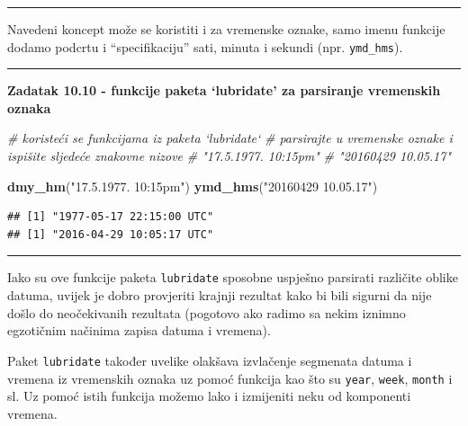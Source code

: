 \documentclass[]{book}
\newenvironment{Shaded}{\begin{snugshade}}{\end{snugshade}}
\newcommand{\KeywordTok}[1]{\textcolor[rgb]{0.13,0.29,0.53}{\textbf{#1}}}
\newcommand{\StringTok}[1]{\textcolor[rgb]{0.31,0.60,0.02}{#1}}
\newcommand{\CommentTok}[1]{\textcolor[rgb]{0.56,0.35,0.01}{\textit{#1}}}
\newcommand{\NormalTok}[1]{#1}
\theoremstyle{definition}
\theoremstyle{definition}
\theoremstyle{definition}
\theoremstyle{remark}
\begin{document}
\begin{center}\rule{0.5\linewidth}{\linethickness}\end{center}

Navedeni koncept može se koristiti i za vremenske oznake, samo imenu
funkcije dodamo podcrtu i ``specifikaciju'' sati, minuta i sekundi (npr.
\texttt{ymd\_hms}).

\begin{center}\rule{0.5\linewidth}{\linethickness}\end{center}

\textbf{Zadatak 10.10 - funkcije paketa `lubridate' za parsiranje
vremenskih oznaka}

\begin{Shaded}
\begin{Highlighting}[]
\CommentTok{# koristeći se funkcijama iz paketa `lubridate`}
\CommentTok{# parsirajte u vremenske oznake i ispišite sljedeće znakovne nizove}
\CommentTok{# "17.5.1977. 10:15pm"}
\CommentTok{# "20160429 10.05.17"}
\end{Highlighting}
\end{Shaded}

\begin{Shaded}
\begin{Highlighting}[]
\KeywordTok{dmy_hm}\NormalTok{(}\StringTok{"17.5.1977. 10:15pm"}\NormalTok{)}
\KeywordTok{ymd_hms}\NormalTok{(}\StringTok{"20160429 10.05.17"}\NormalTok{)}
\end{Highlighting}
\end{Shaded}

\begin{verbatim}
## [1] "1977-05-17 22:15:00 UTC"
## [1] "2016-04-29 10:05:17 UTC"
\end{verbatim}

\begin{center}\rule{0.5\linewidth}{\linethickness}\end{center}

Iako su ove funkcije paketa \texttt{lubridate} sposobne uspješno
parsirati različite oblike datuma, uvijek je dobro provjeriti krajnji
rezultat kako bi bili sigurni da nije došlo do neočekivanih rezultata
(pogotovo ako radimo sa nekim iznimno egzotičnim načinima zapisa datuma
i vremena).

Paket \texttt{lubridate} također uvelike olakšava izvlačenje segmenata
datuma i vremena iz vremenskih oznaka uz pomoć funkcija kao što su
\texttt{year}, \texttt{week}, \texttt{month} i sl. Uz pomoć istih
funkcija možemo lako i izmijeniti neku od komponenti vremena.
\end{document}
